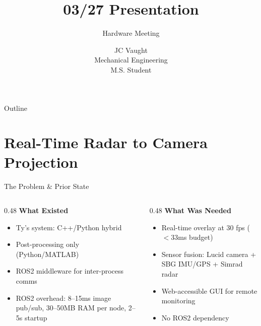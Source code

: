 \documentclass[10pt, aspectratio=169]{beamer}
\title[03/27 HARDWARE]{03/27 Presentation}
\subtitle{Hardware Meeting}
\author[JC Vaught]{JC Vaught\\
Mechanical Engineering\\
M.S. Student}
\institute[UofSC]{}  %
\date{}              %
\begin{document}
{
  \begin{frame}[plain]
    \titlepage
  \end{frame}
}

\begin{frame}{Outline}
  \tableofcontents
\end{frame}

\section{Real-Time Radar to Camera Projection}

\begin{frame}{The Problem \& Prior State}
  \begin{columns}[T]
    \begin{column}{0.48\textwidth}
      \textbf{What Existed}
      \begin{itemize}
        \item Ty's system: C++/Python hybrid
        \item Post-processing only (Python/MATLAB)
        \item ROS2 middleware for inter-process comms
        \item ROS2 overhead: 8--15ms image pub/sub, 30--50MB RAM per node, 2--5s startup
      \end{itemize}
    \end{column}
    \begin{column}{0.48\textwidth}
      \textbf{What Was Needed}
      \begin{itemize}
        \item Real-time overlay at 30 fps ($<$33ms budget)
        \item Sensor fusion: Lucid camera + SBG IMU/GPS + Simrad radar
        \item Web-accessible GUI for remote monitoring
        \item No ROS2 dependency
      \end{itemize}
    \end{column}
  \end{columns}
\end{frame}
\end{document}
